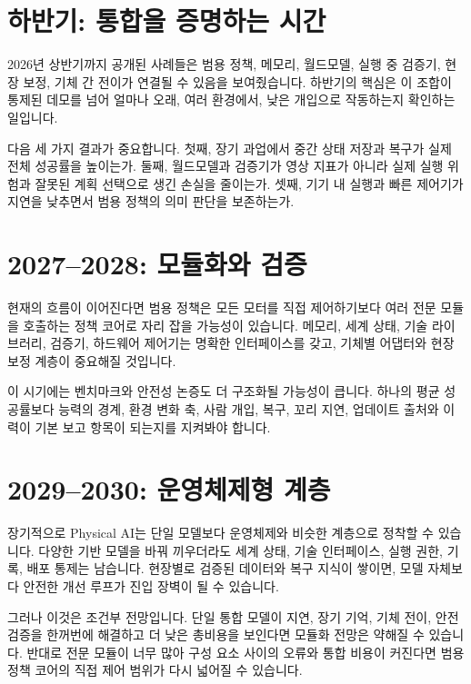 \documentclass[11pt,openany]{book}
\begin{document}
\section{하반기: 통합을 증명하는 시간}

2026년 상반기까지 공개된 사례들은 범용 정책, 메모리, 월드모델, 실행 중 검증기, 현장 보정, 기체 간 전이가 연결될 수 있음을 보여줬습니다. 하반기의 핵심은 이 조합이 통제된 데모를 넘어 얼마나 오래, 여러 환경에서, 낮은 개입으로 작동하는지 확인하는 일입니다.

다음 세 가지 결과가 중요합니다. 첫째, 장기 과업에서 중간 상태 저장과 복구가 실제 전체 성공률을 높이는가. 둘째, 월드모델과 검증기가 영상 지표가 아니라 실제 실행 위험과 잘못된 계획 선택으로 생긴 손실을 줄이는가. 셋째, 기기 내 실행과 빠른 제어기가 지연을 낮추면서 범용 정책의 의미 판단을 보존하는가.

\section{2027--2028: 모듈화와 검증}

현재의 흐름이 이어진다면 범용 정책은 모든 모터를 직접 제어하기보다 여러 전문 모듈을 호출하는 정책 코어로 자리 잡을 가능성이 있습니다. 메모리, 세계 상태, 기술 라이브러리, 검증기, 하드웨어 제어기는 명확한 인터페이스를 갖고, 기체별 어댑터와 현장 보정 계층이 중요해질 것입니다.

이 시기에는 벤치마크와 안전성 논증도 더 구조화될 가능성이 큽니다. 하나의 평균 성공률보다 능력의 경계, 환경 변화 축, 사람 개입, 복구, 꼬리 지연, 업데이트 출처와 이력이 기본 보고 항목이 되는지를 지켜봐야 합니다.

\section{2029--2030: 운영체제형 계층}

장기적으로 Physical AI는 단일 모델보다 운영체제와 비슷한 계층으로 정착할 수 있습니다. 다양한 기반 모델을 바꿔 끼우더라도 세계 상태, 기술 인터페이스, 실행 권한, 기록, 배포 통제는 남습니다. 현장별로 검증된 데이터와 복구 지식이 쌓이면, 모델 자체보다 안전한 개선 루프가 진입 장벽이 될 수 있습니다.

그러나 이것은 조건부 전망입니다. 단일 통합 모델이 지연, 장기 기억, 기체 전이, 안전 검증을 한꺼번에 해결하고 더 낮은 총비용을 보인다면 모듈화 전망은 약해질 수 있습니다. 반대로 전문 모듈이 너무 많아 구성 요소 사이의 오류와 통합 비용이 커진다면 범용 정책 코어의 직접 제어 범위가 다시 넓어질 수 있습니다.
\end{document}
